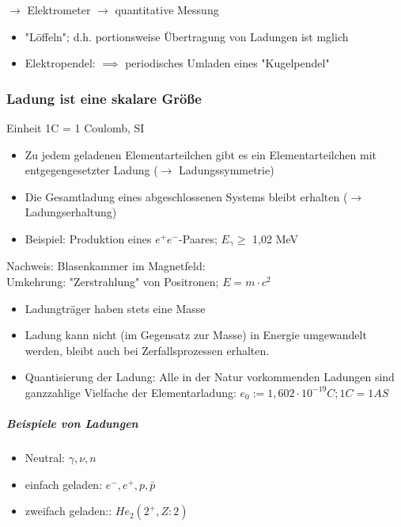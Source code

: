 \documentclass[11pt]{article}
\begin{document}
			$\rightarrow$ Elektrometer $\rightarrow$ quantitative Messung
			\begin{itemize}
				\item "L\"{o}ffeln"; d.h. portionsweise Übertragung von Ladungen ist mglich
				\item Elektropendel: $\implies$ periodisches Umladen eines "Kugelpendel"
			\end{itemize}
			
			\subsubsection{Ladung ist eine skalare Gr\"{o}\ss{}e } Einheit 1C = 1 Coulomb, SI
				\begin{itemize}
					\item Zu jedem geladenen Elementarteilchen gibt es ein Elementarteilchen mit entgegengesetzter Ladung ($\rightarrow$ Ladungssymmetrie)
					\item Die Gesamtladung eines abgeschlossenen Systems bleibt erhalten ($\rightarrow$ Ladungserhaltung)
					\item Beispiel: Produktion eines $ e^+e^- $-Paares; $ E_\gamma \geq $ 1,02 MeV
				\end{itemize}
				
				\newpage
				
				\noindent Nachweis: Blasenkammer im Magnetfeld:  \hfill \\
				Umkehrung: "Zerstrahlung" von Positronen; $E=m\cdot c^2$
				\begin{itemize}
					\item Ladungtr\"{a}ger haben stets eine Masse
					\item Ladung kann nicht (im Gegensatz zur Masse) in Energie umgewandelt werden, bleibt auch bei Zerfallsprozessen erhalten.
					\item Quantisierung der Ladung: Alle in der Natur vorkommenden Ladungen sind ganzzahlige Vielfache der Elementarladung: $e_0:=1,602\cdot10^{-19}C; 1C=1AS$
				\end{itemize}
				\subparagraph{Beispiele von Ladungen}
				\begin{itemize}
					\item Neutral: $\gamma, \nu, n$
					\item einfach geladen: $e^-,e^+,p, \bar{p}$
					\item zweifach geladen:: $He_2(2^+,Z:2)$
				\end{itemize}	
				
\newpage
\end{document}
